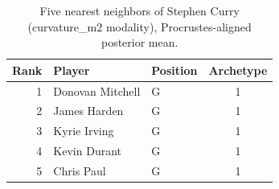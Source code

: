 \begin{table}[htbp]
  \centering\small
  \begin{tabular}{rllc}
    \toprule
    Rank & Player & Position & Archetype \\
    \midrule
    1 & Donovan Mitchell & G & 1 \\
    2 & James Harden & G & 1 \\
    3 & Kyrie Irving & G & 1 \\
    4 & Kevin Durant & G & 1 \\
    5 & Chris Paul & G & 1 \\
    \bottomrule
  \end{tabular}
  \caption{Five nearest neighbors of Stephen Curry (curvature_m2 modality), Procrustes-aligned posterior mean.}
  \label{tab:Stephen_Curry_neighbors_curvature_m2}
\end{table}

